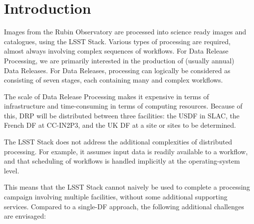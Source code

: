 \section{Introduction}

Images from the Rubin Observatory are processed into science ready images and catalogues, using the LSST Stack. Various types of processing are required, almost always involving complex sequences of workflows. For Data Release Processing, we are primarily interested in the production of (usually annual) Data Releases. For Data Releases, processing can logically be considered as consisting of seven stages, each containing many and complex workflows.

The scale of Data Release Processing makes it expensive in terms of infrastructure and time-consuming in terms of computing resources. Because of this, DRP will be distributed between three facilities: the USDF in SLAC, the French DF at CC-IN2P3, and the UK DF at a site or sites to be determined.

The LSST Stack does not address the additional complexities of distributed processing. For example, it assumes input data is readily available to a workflow, and that scheduling of workflows is handled implicitly at the operating-system level.

This means that the LSST Stack cannot naively be used to complete a processing campaign involving multiple facilities, without some additional supporting services. Compared to a single-DF approach, the following additional challenges are envisaged:


